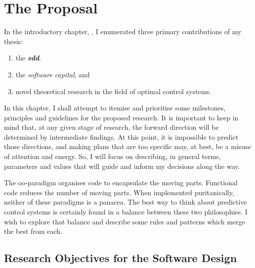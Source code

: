 %
\chapter{The Proposal}%
\label{chap:proposal}


In the introductory chapter, , I enumerated three
primary contributions of my thesis:
%
%
\begin{enumerate}[label=(C\arabic*)]
  \item the \textbf{\textit{\acl{sdd}}}. \label{contrib:design}
  \item the \emph{software capital}, and \label{contrib:capital}
  \item novel theoretical research in the field of optimal control
  systems.\label{contrib:theory}
\end{enumerate}
In this chapter, I shall attempt to itemise and prioritise some milestones,
principles and guidelines for the proposed research. It is important to keep in
mind that, at any given stage of research, the forward direction will be
determined by intermediate findings. At this point, it is impossible to predict
those directions, and making plans that are too specific may, at best, be a
misuse of attention and energy. So, I will focus on describing, in general
terms, parameters and values that will guide and inform my decisions along the
way.

The \ac{oo}-paradigm organises code to encapsulate the moving parts. Functional
code reduces the number of moving parts. When implemented puritanically, neither
of these paradigms is a panacea. The best way to think about predictive control
systems is certainly found in a balance between these two philosophies. I wish
to explore that balance and describe some rules and patterns which merge the
best from each.



\section{Research Objectives for the Software Design}


